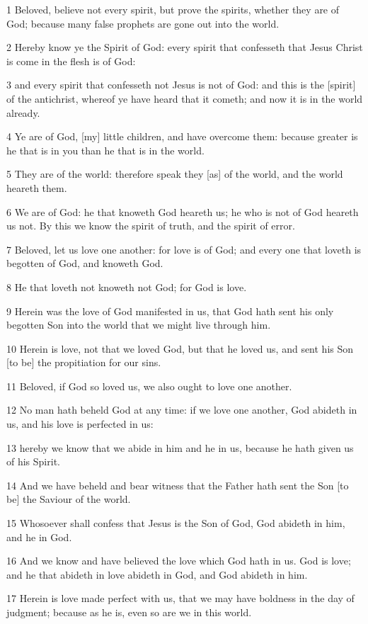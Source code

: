 \par 1 Beloved, believe not every spirit, but prove the spirits, whether they are of God; because many false prophets are gone out into the world.
\par 2 Hereby know ye the Spirit of God: every spirit that confesseth that Jesus Christ is come in the flesh is of God:
\par 3 and every spirit that confesseth not Jesus is not of God: and this is the [spirit] of the antichrist, whereof ye have heard that it cometh; and now it is in the world already.
\par 4 Ye are of God, [my] little children, and have overcome them: because greater is he that is in you than he that is in the world.
\par 5 They are of the world: therefore speak they [as] of the world, and the world heareth them.
\par 6 We are of God: he that knoweth God heareth us; he who is not of God heareth us not. By this we know the spirit of truth, and the spirit of error.
\par 7 Beloved, let us love one another: for love is of God; and every one that loveth is begotten of God, and knoweth God.
\par 8 He that loveth not knoweth not God; for God is love.
\par 9 Herein was the love of God manifested in us, that God hath sent his only begotten Son into the world that we might live through him.
\par 10 Herein is love, not that we loved God, but that he loved us, and sent his Son [to be] the propitiation for our sins.
\par 11 Beloved, if God so loved us, we also ought to love one another.
\par 12 No man hath beheld God at any time: if we love one another, God abideth in us, and his love is perfected in us:
\par 13 hereby we know that we abide in him and he in us, because he hath given us of his Spirit.
\par 14 And we have beheld and bear witness that the Father hath sent the Son [to be] the Saviour of the world.
\par 15 Whosoever shall confess that Jesus is the Son of God, God abideth in him, and he in God.
\par 16 And we know and have believed the love which God hath in us. God is love; and he that abideth in love abideth in God, and God abideth in him.
\par 17 Herein is love made perfect with us, that we may have boldness in the day of judgment; because as he is, even so are we in this world.
